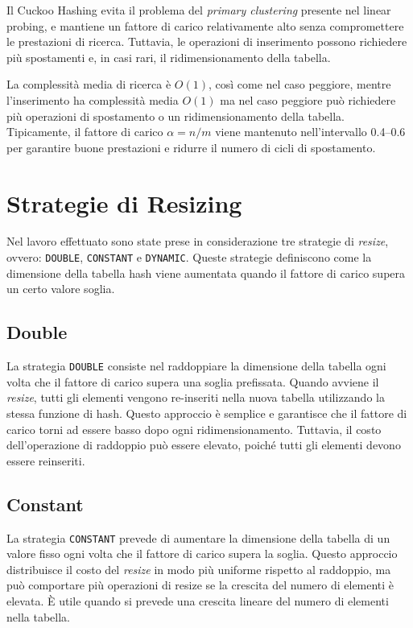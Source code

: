 Il Cuckoo Hashing evita il problema del \textit{primary clustering} presente nel linear probing, e mantiene un fattore di carico relativamente alto 
senza compromettere le prestazioni di ricerca. Tuttavia, le operazioni di inserimento possono richiedere più spostamenti e, in casi rari, 
il ridimensionamento della tabella.

La complessità media di ricerca è $O(1)$, così come nel caso peggiore, mentre l’inserimento ha complessità media $O(1)$ ma nel caso peggiore 
può richiedere più operazioni di spostamento o un ridimensionamento della tabella. Tipicamente, il fattore di carico $\alpha = n/m$ viene mantenuto 
nell’intervallo 0.4–0.6 per garantire buone prestazioni e ridurre il numero di cicli di spostamento.


\section{Strategie di Resizing}

Nel lavoro effettuato sono state prese in considerazione tre strategie di \textit{resize}, ovvero:  
\texttt{DOUBLE}, \texttt{CONSTANT} e \texttt{DYNAMIC}.  
Queste strategie definiscono come la dimensione della tabella hash viene aumentata quando il fattore di carico supera un certo valore soglia.

\subsection{Double}

La strategia \texttt{DOUBLE} consiste nel raddoppiare la dimensione della tabella ogni volta che il fattore di carico supera una soglia prefissata.  
Quando avviene il \textit{resize}, tutti gli elementi vengono re-inseriti nella nuova tabella utilizzando la stessa funzione di hash.  
Questo approccio è semplice e garantisce che il fattore di carico torni ad essere basso dopo ogni ridimensionamento.  
Tuttavia, il costo dell’operazione di raddoppio può essere elevato, poiché tutti gli elementi devono essere reinseriti.

\subsection{Constant}

La strategia \texttt{CONSTANT} prevede di aumentare la dimensione della tabella di un valore fisso ogni volta che il fattore di carico supera la soglia.  
Questo approccio distribuisce il costo del \textit{resize} in modo più uniforme rispetto al raddoppio, ma può comportare più operazioni 
di resize se la crescita del numero di elementi è elevata.  
È utile quando si prevede una crescita lineare del numero di elementi nella tabella.

